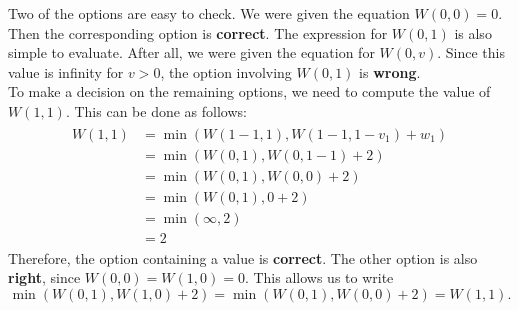 \documentclass[11pt]{article}
\begin{document}
Two of the options are easy to check. We were given the equation \(W(0,0)=0\).
Then the corresponding option is \textbf{correct}. The expression for \(W(0,1)\) is
also simple to evaluate. After all, we were given the equation for \(W(0,v)\).
Since this value is infinity for \(v>0\), the option involving \(W(0,1)\) is
\textbf{wrong}.\\
To make a decision on the remaining options, we need to compute the value of
\(W(1,1)\). This can be done as follows:
\begin{align}
  \begin{split}
    W(1,1)&=\min(W(1-1,1),W(1-1,1-v_1)+w_1)\\
    &=\min(W(0,1),W(0,1-1)+2)\\
    &=\min(W(0,1),W(0,0)+2)\\
    &=\min(W(0,1),0+2)\\
    &=\min(\infty,2)\\
    &=2
  \end{split}
\end{align}
Therefore, the option containing a value is \textbf{correct}. The other option is also
\textbf{right}, since \(W(0,0)=W(1,0)=0\). This allows us to write
\begin{equation}
\min(W(0,1),W(1,0)+2)=\min(W(0,1),W(0,0)+2)=W(1,1).
\end{equation}
\end{document}
